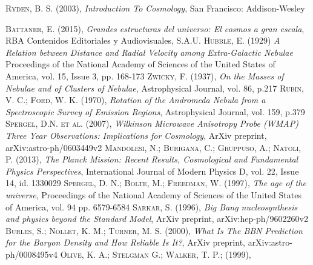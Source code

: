 \documentclass[a4paper,openright,12pt]{book}
\begin{document}
\cleardoublepage
{}
\begin{thebibliography}{a}

 \textsc{Ryden, B. S. (2003)},
\textit{Introduction To Cosmology},
San Francisco: Addison-Wesley

 \textsc{Battaner, E. (2015)},
\textit{Grandes estructuras del universo: El cosmos a gran escala},
RBA Contenidos Editoriales y Audiovisuales, S.A.U.
 \textsc{Hubble, E. (1929)}
\textit{A Relation between Distance and Radial Velocity among Extra-Galactic Nebulae}
Proceedings of the National Academy of Sciences of the United States of America, vol. 15, Issue 3, pp. 168-173
 \textsc{Zwicky, F. (1937)},
\textit{On the Masses of Nebulae and of Clusters of Nebulae},
Astrophysical Journal, vol. 86, p.217
 \textsc{Rubin, V. C.; Ford, W. K. (1970)},
\textit{Rotation of the Andromeda Nebula from a Spectroscopic Survey of Emission Regions},
Astrophysical Journal, vol. 159, p.379 
 \textsc{Spergel, D.N. et al. (2007)},
\textit{Wilkinson Microwave Anisotropy Probe (WMAP) Three Year
Observations: Implications for Cosmology},
ArXiv preprint, arXiv:astro-ph/0603449v2
 \textsc{Mandolesi, N.; Burigana, C.; Gruppuso, A.; Natoli, P. (2013)},
\textit{The Planck Mission: Recent Results, Cosmological and Fundamental Physics Perspectives},
International Journal of Modern Physics D, vol. 22, Issue 14, id. 1330029
 \textsc{Spergel, D. N.; Bolte, M.; Freedman, W. (1997)},
\textit{The age of the universe},
Proceedings of the National Academy of Sciences of the United States of America, vol. 94 pp. 6579-6584
 \textsc{Sarkar, S. (1996)},
\textit{Big Bang nucleosynthesis and physics beyond the Standard Model},
ArXiv preprint, arXiv:hep-ph/9602260v2
 \textsc{Burles, S.; Nollet, K. M.; Turner, M. S. (2000)},
\textit{What Is The BBN Prediction for the Baryon Density and How Reliable Is It?},
ArXiv preprint, arXiv:astro-ph/0008495v4
 \textsc{Olive, K. A.; Stelgman G.; Walker, T. P.; (1999)},

\end{thebibliography}
\end{document}
